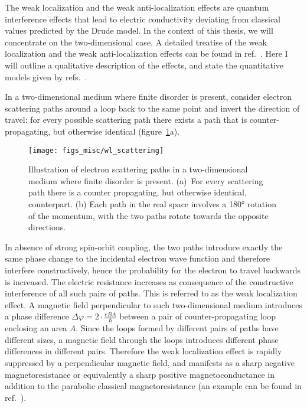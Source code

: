 The weak localization and the weak anti-localization effects are quantum interference effects that lead to electric conductivity deviating from classical values predicted by the Drude model. In the context of this thesis, we will concentrate on the two-dimensional case. A detailed treatise of the weak localization and the weak anti-localization effects can be found in ref.~\cite{bergmann1984}. Here I will outline a qualitative description of the effects, and state the quantitative models given by refs.~\cite{bergmann1984, anderson1979, WL_HLN, WAL_theory, WL_Khmel}.

In a two-dimensional medium where finite disorder is present, consider electron scattering paths around a loop back to the same point and invert the direction of travel: for every possible scattering path there exists a path that is counter-propagating, but otherwise identical (figure~\ref{fig:bg_scattering}a).%
\begin{figure}[ht]%
    \centering%
    \texttt{[image: figs\_misc/wl\_scattering]}%
    \caption[Schematic illustrations of electron scattering paths in two-dimensions.]{\label{fig:bg_scattering}Illustration of electron scattering paths in a two-dimensional medium where finite disorder is present. (a)~For every scattering path there is a counter propagating, but otherwise identical, counterpart. (b) Each path in the real space involves a \ang{180} rotation of the momentum, with the two paths rotate towards the opposite directions.}%
\end{figure}%

In absence of strong spin-orbit coupling, the two paths introduce exactly the same phase change to the incidental electron wave function and therefore interfere constructively, hence the probability for the electron to travel backwards is increased. The electric resistance increases as consequence of the constructive interference of all such pairs of paths. This is referred to as the weak localization effect. A magnetic field perpendicular to such two-dimensional medium introduces a phase difference $\Delta\varphi = 2\cdot\frac{eBA}{\hbar}$ between a pair of counter-propagating loop enclosing an area $A$. Since the loops formed by different pairs of paths have different sizes, a magnetic field through the loops introduces different phase differences in different pairs. Therefore the weak localization effect is rapidly suppressed by a perpendicular magnetic field, and manifests as a sharp negative magnetoresistance or equivalently a sharp positive magnetoconductance in addition to the parabolic classical magnetoresistance (an example can be found in ref.~\cite{bishop1982}).


